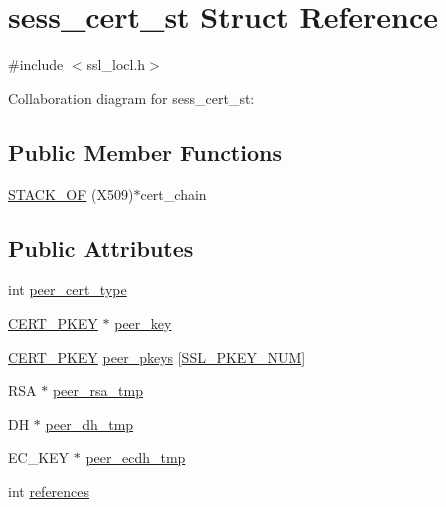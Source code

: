 \hypertarget{structsess__cert__st}{\section{sess\-\_\-cert\-\_\-st Struct Reference}
\label{structsess__cert__st}
}


{\ttfamily \#include $<$ssl\-\_\-locl.\-h$>$}



Collaboration diagram for sess\-\_\-cert\-\_\-st\-:
\subsection*{Public Member Functions}
\begin{DoxyCompactItemize}
\item 
\hyperlink{structsess__cert__st_a7f6d3c322a04b8253ca8e8e5c24e4503}{S\-T\-A\-C\-K\-\_\-\-O\-F} (X509)$\ast$cert\-\_\-chain
\end{DoxyCompactItemize}
\subsection*{Public Attributes}
\begin{DoxyCompactItemize}
\item 
int \hyperlink{structsess__cert__st_a42bfbd0ac3523b3dcac8cd6a93888a68}{peer\-\_\-cert\-\_\-type}
\item 
\hyperlink{ssl__locl_8h_ab376b10820d145fbabe4f4fdf0b3a770}{C\-E\-R\-T\-\_\-\-P\-K\-E\-Y} $\ast$ \hyperlink{structsess__cert__st_ac2fb4296b098a8ce04891bd06e44b474}{peer\-\_\-key}
\item 
\hyperlink{ssl__locl_8h_ab376b10820d145fbabe4f4fdf0b3a770}{C\-E\-R\-T\-\_\-\-P\-K\-E\-Y} \hyperlink{structsess__cert__st_a1430cf781fb5735b9884b2273005683e}{peer\-\_\-pkeys} \mbox{[}\hyperlink{ssl__locl_8h_ae56b6c56e5819da2bf95a533238f69f8}{S\-S\-L\-\_\-\-P\-K\-E\-Y\-\_\-\-N\-U\-M}\mbox{]}
\item 
R\-S\-A $\ast$ \hyperlink{structsess__cert__st_a589cc0b60fd0b93e39ac7829416a6b69}{peer\-\_\-rsa\-\_\-tmp}
\item 
D\-H $\ast$ \hyperlink{structsess__cert__st_a8a3ab6cdc82bf76e9696da0473e9ed0b}{peer\-\_\-dh\-\_\-tmp}
\item 
E\-C\-\_\-\-K\-E\-Y $\ast$ \hyperlink{structsess__cert__st_a2207bc91b952ac89b19ea0bedc9d9697}{peer\-\_\-ecdh\-\_\-tmp}
\item 
int \hyperlink{structsess__cert__st_a5f7d4df032e6fdb64bf4434497846616}{references}
\end{DoxyCompactItemize}


